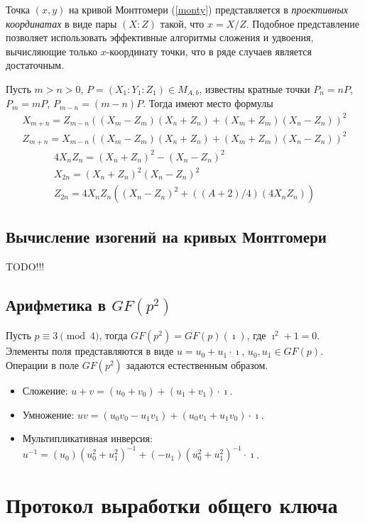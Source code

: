\documentclass[a4paper,12pt]{article}
\theoremstyle{definition}
\begin{document}
Точка $(x,y)$ на кривой Монтгомери (\ref{monty}) представляется в \emph{проективных координатах} в виде пары $(X:Z)$ такой, что $x=X/Z$.
Подобное представление позволяет использовать эффективные алгоритмы сложения и удвоения, вычисляющие только $x$-координату точки, 
что в ряде случаев %
является достаточным.

Пусть $m>n>0$, $P=(X_1:Y_1:Z_1)\in M_{A,b}$, известны кратные точки $P_{n}=nP$, $P_{m}=mP$, $P_{m-n}=(m-n)P$. Тогда имеют место формулы
\begin{eqnarray*}
X_{m+n}=Z_{m-n}((X_m-Z_m)(X_n+Z_n)+(X_m+Z_m)(X_n-Z_n))^2\\
Z_{m+n}=X_{m-n}((X_m-Z_m)(X_n+Z_n)+(X_m+Z_m)(X_n-Z_n))^2
\end{eqnarray*}
\begin{eqnarray*}
4X_nZ_n=(X_n+Z_n)^2-(X_n-Z_n)^2\\
X_{2n}=(X_n+Z_n)^2(X_n-Z_n)^2\\
Z_{2n}=4X_nZ_n((X_n-Z_n)^2+((A+2)/4)(4X_nZ_n))
\end{eqnarray*}

\subsection{Вычисление изогений на кривых Монтгомери}

TODO!!!

\subsection{Арифметика в $GF(p^2)$}

Пусть $p\equiv 3\pmod{4}$, тогда $GF(p^2) = GF(p)(\imath)$, где $\imath^2+1=0$.
Элементы поля представляются в виде $u=u_0+u_1\cdot\imath$, $u_0, u_1\in GF(p)$.
Операции в поле $GF(p^2)$ задаются естественным образом.
\begin{itemize}
 \item Сложение: $u+v = (u_0+v_0) + (u_1+v_1)\cdot\imath$.
 \item Умножение: $uv = (u_0v_0-u_1v_1) + (u_0v_1+u_1v_0)\cdot\imath$.
 \item Мультипликативная инверсия: $u^{-1} = (u_0)(u_0^2+u_1^2)^{-1} + (-u_1)(u_0^2+u_1^2)^{-1}\cdot\imath   $.
\end{itemize}




\section{Протокол выработки общего ключа}\label{protodesc}
\end{document}
